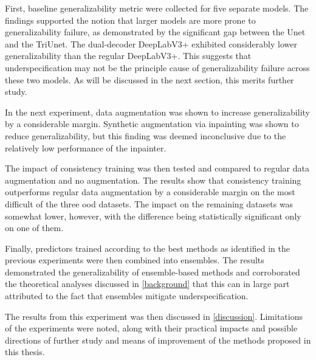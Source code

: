 First, baseline generalizability metric were collected for five separate models. The findings supported the notion that larger models are more prone to generalizability failure, as demonstrated by the significant gap between the Unet and the TriUnet. The dual-decoder DeepLabV3+ exhibited considerably lower generalizability than the regular DeepLabV3+. This suggests that underspecification may not be the principle cause of generalizability failure across these two models. As will be discussed in the next section, this merits further study.

In the next experiment, data augmentation was shown to increase generalizability by a considerable margin. Synthetic augmentation via inpainting was shown to reduce generalizability, but this finding was deemed inconclusive due to the relatively low performance of the inpainter. 

The impact of consistency training was then tested and compared to regular data augmentation and no augmentation. The results show that consistency training outperforms regular data augmentation by a considerable margin on the most difficult of the three \gls{ood} datasets. The impact on the remaining datasets was somewhat lower, however, with the difference being statistically significant only on one of them. 

Finally, predictors trained according to the best methods as identified in the previous experiments were then combined into ensembles. The results demonstrated the generalizability of ensemble-based methods and corroborated the theoretical analyses discussed in \cref{background} that this can in large part attributed to the fact that ensembles mitigate underspecification. 

The results from this experiment was then discussed in \cref{discussion}. Limitations of the experiments were noted, along with their practical impacts and possible directions of further study and means of improvement of the methods proposed in this thesis. 

